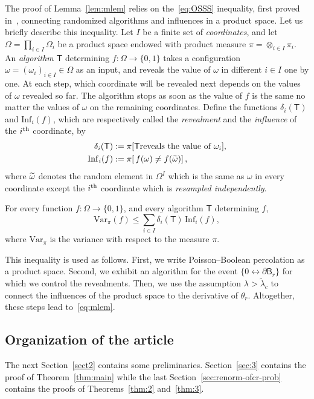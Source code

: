 \documentclass[AHL,Unicode,longabstracts]{cedram}
\newcommand{\var}{\mathrm{Var}}
\newcommand{\infl}{\mathrm{Inf}}
\let\oldtilde\tilde
\renewcommand*{\tilde}[1]{\mathchoice{\widetilde{#1}}{\widetilde{#1}}{\oldtilde{#1}}{\oldtilde{#1}}}
\begin{document}
The proof of Lemma~\ref{lem:mlem} relies on the~\eqref{eq:OSSS} inequality, first proved in~\cite{OSSS}, connecting randomized algorithms and influences in a product space. Let us briefly describe this inequality. Let $ I$ be a finite set of \emph{coordinates}, and let $\Omega =\prod_{i \in I} \Omega_i$ be a product space endowed with product measure $\pi =\otimes_{i \in I} \pi_i$. An \emph{algorithm $\mathsf T$} determining $f: \Omega \rightarrow \{0,1\}$ takes a configuration $\omega=(\omega_i)_{i\in I}\in\Omega$ as an input, and reveals the value of $\omega$ in different $i\in I$ one by one. At each step, which coordinate will be revealed next depends on the values of $\omega$ revealed so far. The algorithm stops as soon as the value of $f$ is the same no matter the values of $\omega$ on the remaining coordinates. Define the functions $\delta_i(\mathsf T)$ and $\infl_{i}(f)$, which are respectively called the \emph{revealment} and the \emph{influence} of the $i^{\rm th}$ coordinate, by
\begin{align*}
\delta_i(\mathsf T) &:= \pi[\mathsf T \text{reveals the value of } \omega_i],\\
\infl_i(f) &:= \pi [\, f (\omega) \neq f(\tilde\omega)]\,,
\end{align*}
where $\tilde\omega$ denotes the random element in $\Omega^I$ which is the same as $\omega$ in every coordinate except the $i^{\rm th}$ coordinate which is \emph{resampled independently}.
\begin{theo} \label{thm:OSSS2}
For every function $f: \Omega \rightarrow \{0,1\}$, and every algorithm $\mathsf T$ determining $f$,
\begin{equation}\label{eq:OSSS}
\tag{OSSS}
\var_\pi (f) \leq \sum_{i\in I} \delta_{i}(\mathsf T) \, \infl_{i}(f),
\end{equation}
where $\var_\pi$ is the variance with respect to the measure $\pi$.
\end{theo}

This inequality is used as follows. First, we write Poisson--Boolean percolation as a product space. Second, we exhibit an algorithm for the event $\{0\leftrightarrow\partial\mathsf B_r \}$ for which we control the revealments. Then, we use the assumption $\lambda > \widetilde\lambda_c$ to connect the influences of the product space to the derivative of $\theta_r$. Altogether, these steps lead to~\eqref{eq:mlem}.

\subsection*{Organization of the article}
The next Section~\ref{sect2} contains some preliminaries. Section~\ref{sec:3} contains the proof of Theorem~\ref{thm:main} while the last Section~\ref{sec:renorm-ofcr-prob} contains the proofs of Theorems~\ref{thm:2} and~\ref{thm:3}.
\end{document}
